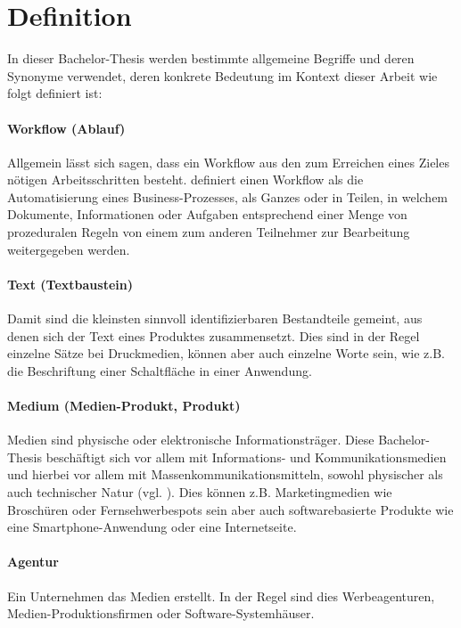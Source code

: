 \section{Definition}
\label{l:def}

In dieser Bachelor-Thesis werden bestimmte allgemeine Begriffe und deren Synonyme verwendet, deren konkrete Bedeutung im Kontext dieser Arbeit wie folgt definiert ist:

\paragraph{Workflow (Ablauf)} Allgemein lässt sich sagen, dass ein Workflow aus den zum Erreichen eines Zieles nötigen Arbeitsschritten besteht. \cite[S.8]{wmc} definiert einen Workflow als die Automatisierung eines Business-Prozesses, als Ganzes oder in Teilen, in welchem Dokumente, Informationen oder Aufgaben entsprechend einer Menge von prozeduralen Regeln von einem zum anderen Teilnehmer zur Bearbeitung weitergegeben werden. 

\paragraph{Text (Textbaustein)} Damit sind die kleinsten sinnvoll identifizierbaren Bestandteile gemeint, aus denen sich der Text eines Produktes zusammensetzt. Dies sind in der Regel einzelne Sätze bei Druckmedien, können aber auch einzelne Worte sein, wie z.B. die Beschriftung einer Schaltfläche in einer Anwendung.

\paragraph{Medium (Medien-Produkt, Produkt)} Medien sind physische oder elektronische Informationsträger. Diese Bachelor-Thesis beschäftigt sich vor allem mit Informations- und Kommunikationsmedien und hierbei vor allem mit Massenkommunikationsmitteln, sowohl physischer als auch technischer Natur (vgl. \cite[S.199--201]{schanze2002metzler}). Dies können z.B. Marketingmedien wie Broschüren oder Fernsehwerbespots sein aber auch softwarebasierte Produkte wie eine Smartphone-Anwendung oder eine Internetseite. 

\paragraph{Agentur} Ein Unternehmen das Medien erstellt. In der Regel sind dies Werbeagenturen, Medien-Produktionsfirmen oder Software-Systemhäuser. 

